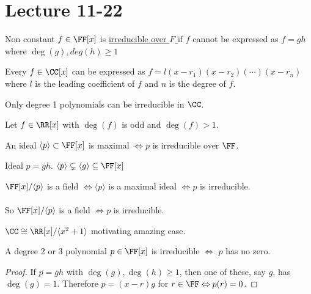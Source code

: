 \documentclass[class=scrartcl, crop=false]{standalone}
\date{2019-11-22}
\begin{document}
\section{Lecture 11-22}

Non constant $f \in \FF[x]$ is \ul{irreducible over $F$ } if $f$ cannot be expressed as $f = gh$ where $\deg(g), deg(h) \geq 1$

\begin{theorem}
  Every $f \in \CC[x]$ can be expressed as $f = l(x - r_1)(x - r_2)(\cdots)(x - r_n)$ where $l$ is the leading coefficient of $f$ and $n$ is the degree of $f$.
  \begin{corollary}
    Only degree 1 polynomials can be irreducible in $\CC$.
  \end{corollary} 
\end{theorem} 

\begin{example}
  Let $f \in \RR[x]$ with $\deg(f)$ is odd and $\deg(f) > 1$.
\end{example} 

\begin{theorem}
  An ideal $\langle p \rangle \subset \FF[x]$ is maximal $\Leftrightarrow p$  is irreducible over $\FF$.
  \begin{recall}
    Ideal $p = gh$. $\langle p \rangle \subsetneq \langle g \rangle \subseteq \FF[x]$
  \end{recall} 
\end{theorem} 

\begin{theorem}
  $\FF[x] / \langle p \rangle $ is a field $\Leftrightarrow \langle p \rangle $ is a maximal ideal $\Leftrightarrow p$ is irreducible.
  \\\\
  So $\FF[x] / \langle p \rangle $ is a field $\Leftrightarrow p$ is irreducible.
\end{theorem} 

\begin{example}
  $\CC \cong \RR[x] / \langle x^2 + 1 \rangle $ motivating amazing case.
\end{example} 

\begin{lemma}
  A degree 2 or 3 polynomial $p \in \FF[x]$ is irreducible $\Leftrightarrow$ $p$ has no zero.
  \begin{proof}
    If $p = gh$ with $\deg(g), \deg(h) \geq 1$, then one of these, say $g$, has $\deg(g) = 1$. Therefore $p = (x - r)g$ for $r \in \FF \Leftrightarrow p(r) = 0$.
  \end{proof} 
\end{lemma} 
\end{document}

